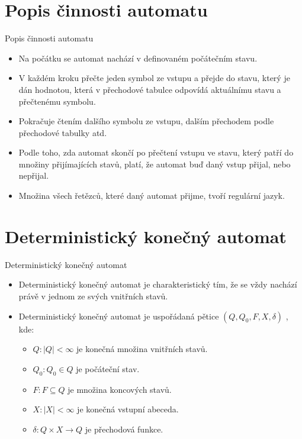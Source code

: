 \documentclass[10pt, hyperref={unicode}]{beamer}
\begin{document}
\section{Popis činnosti automatu}
\begin{frame}{Popis činnosti automatu}
\begin{itemize}
    \item Na počátku se automat nachází v definovaném počátečním stavu.
    \item V každém kroku přečte jeden symbol ze vstupu a přejde do stavu, který je dán hodnotou, která v přechodové tabulce odpovídá aktuálnímu stavu a přečtenému symbolu.
    \item Pokračuje čtením dalšího symbolu ze vstupu, dalším přechodem podle přechodové tabulky atd.
    \item Podle toho, zda automat skončí po přečtení vstupu ve stavu, který patří do množiny přijímajících stavů, platí, že automat buď daný vstup přijal, nebo nepřijal.
    \item Množina všech řetězců, které daný automat přijme, tvoří regulární jazyk.
\end{itemize}
\end{frame}

\section{Deterministický konečný automat}
\begin{frame}{Deterministický konečný automat}
\begin{itemize}
    \item Deterministický konečný automat je charakteristický tím, že se vždy nachází právě v jednom ze svých vnitřních stavů.
    \item Deterministický konečný automat je uspořádaná pětice $(Q,Q_0,F,X,\delta)$ , kde:
        \begin{itemize}
            \item $Q:|Q| < \infty$ je konečná množina vnitřních stavů.
            \item $Q_0:Q_0 \in Q$ je počáteční stav.
            \item $F:F \subseteq Q$ je množina koncových stavů.
            \item $X:|X| < \infty$ je konečná vstupní abeceda.
            \item $\delta:Q \times X \rightarrow Q$ je přechodová funkce.
        \end{itemize}
\end{itemize}
\end{frame}
\end{document}
